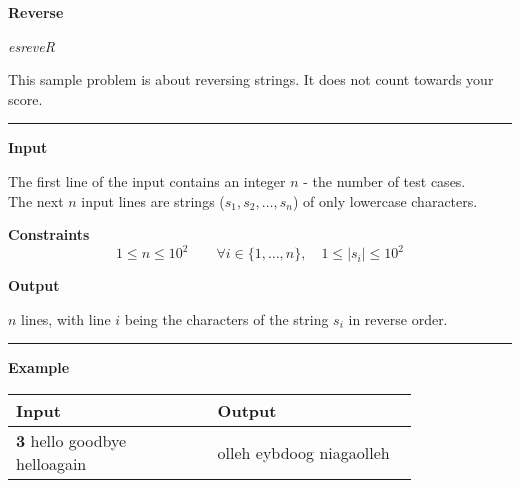 \LARGE {} \textbf{Reverse} \normalsize

{\itshape esreveR}

This sample problem is about reversing strings. It does not count towards your score.

\vspace{8pt}
\hrule

\textbf{Input}

The first line of the input contains an integer $n$ - the number of test cases. \\ 
The next $n$ input lines are strings ($s_1, s_2, \dots, s_n$) of only lowercase characters.

\textbf{Constraints}
\begin{equation*}
    1 \leq n \leq 10^2 \qquad 
    \forall i \in \{1, \dots, n\}, \quad 1 \leq |s_i| \leq 10^2
\end{equation*}

\textbf{Output}

$n$ lines, with line $i$ being the characters of the string $s_i$ in reverse order.

\vspace{8pt}
\hrule

\textbf{Example}

\begin{table}[h]
    \centering
    \begin{tabular}{|p{0.4\linewidth}|p{0.4\linewidth}|}
        \hline
        Input & Output \\
        \hline
        \textbf{3} \newline hello \newline goodbye \newline helloagain & 
        olleh \newline eybdoog \newline niagaolleh \\
        \hline
    \end{tabular}
\end{table}